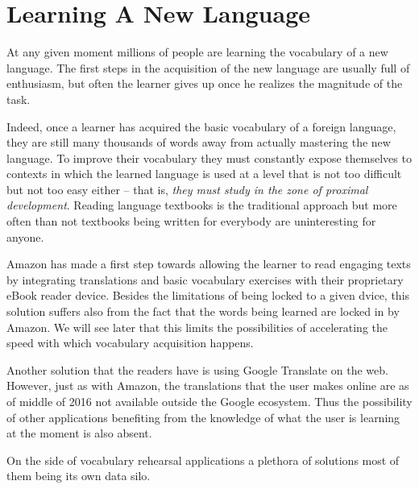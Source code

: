 
\section{Learning A New Language}


At any given moment millions of people are learning the vocabulary of a new language. The first steps in the acquisition of the new language are usually full of enthusiasm, but often the learner gives up once he realizes the magnitude of the task.

Indeed, once a learner has acquired the basic vocabulary of a foreign language, they are still many thousands of words away from actually mastering the new language. To improve their vocabulary they must constantly expose themselves to contexts in which the learned language is used at a level that is not too difficult but not too easy either -- that is, {\em they must study in the zone of proximal development}. Reading language textbooks is the traditional approach but more often than not textbooks being written for everybody are uninteresting for anyone.

Amazon has made a first step towards allowing the learner to read engaging texts by integrating translations and basic vocabulary exercises with their proprietary eBook reader device. Besides the limitations of being locked to a given dvice, this solution suffers also from the fact that the words being learned are locked in by Amazon. We will see later that this limits the possibilities of accelerating the speed with which vocabulary acquisition happens.

Another solution that the readers have is using Google Translate on the web. However, just as with Amazon, the translations that the user makes online are as of middle of 2016 not available outside the Google ecosystem. Thus the possibility of other applications benefiting from the knowledge of what the user is learning at the moment is also absent.

On the side of vocabulary rehearsal applications a plethora of solutions most of them being its own data silo. 

